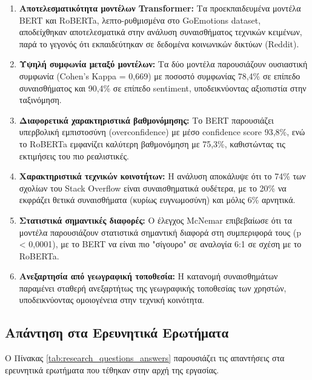 \documentclass[a4paper,11pt,oneside,openany]{ioniothesis}
\begin{document}
\begin{enumerate}
    \item \textbf{Αποτελεσματικότητα μοντέλων Transformer:} Τα προεκπαιδευμένα μοντέλα BERT και RoBERTa, λεπτο-ρυθμισμένα στο GoEmotions dataset, αποδείχθηκαν αποτελεσματικά στην ανάλυση συναισθήματος τεχνικών κειμένων, παρά το γεγονός ότι εκπαιδεύτηκαν σε δεδομένα κοινωνικών δικτύων (Reddit).
    
    \item \textbf{Υψηλή συμφωνία μεταξύ μοντέλων:} Τα δύο μοντέλα παρουσιάζουν ουσιαστική συμφωνία (Cohen's Kappa = 0,669) με ποσοστό συμφωνίας 78,4\% σε επίπεδο συναισθήματος και 90,4\% σε επίπεδο sentiment, υποδεικνύοντας αξιοπιστία στην ταξινόμηση.
    
    \item \textbf{Διαφορετικά χαρακτηριστικά βαθμονόμησης:} Το BERT παρουσιάζει υπερβολική εμπιστοσύνη (overconfidence) με μέσο confidence score 93,8\%, ενώ το RoBERTa εμφανίζει καλύτερη βαθμονόμηση με 75,3\%, καθιστώντας τις εκτιμήσεις του πιο ρεαλιστικές.
    
    \item \textbf{Χαρακτηριστικά τεχνικών κοινοτήτων:} Η ανάλυση αποκάλυψε ότι το 74\% των σχολίων του Stack Overflow είναι συναισθηματικά ουδέτερα, με το 20\% να εκφράζει θετικά συναισθήματα (κυρίως ευγνωμοσύνη) και μόλις 6\% αρνητικά.
    
    \item \textbf{Στατιστικά σημαντικές διαφορές:} Ο έλεγχος McNemar επιβεβαίωσε ότι τα μοντέλα παρουσιάζουν στατιστικά σημαντική διαφορά στη συμπεριφορά τους (p < 0,0001), με το BERT να είναι πιο "σίγουρο" σε αναλογία 6:1 σε σχέση με το RoBERTa.
    
    \item \textbf{Ανεξαρτησία από γεωγραφική τοποθεσία:} Η κατανομή συναισθημάτων παραμένει σταθερή ανεξαρτήτως της γεωγραφικής τοποθεσίας των χρηστών, υποδεικνύοντας ομοιογένεια στην τεχνική κοινότητα.
\end{enumerate}

\subsection{Απάντηση στα Ερευνητικά Ερωτήματα}
\label{sec:Απάντηση στα Ερευνητικά Ερωτήματα}

Ο Πίνακας \ref{tab:research_questions_answers} παρουσιάζει τις απαντήσεις στα ερευνητικά ερωτήματα που τέθηκαν στην αρχή της εργασίας.
\end{document}
